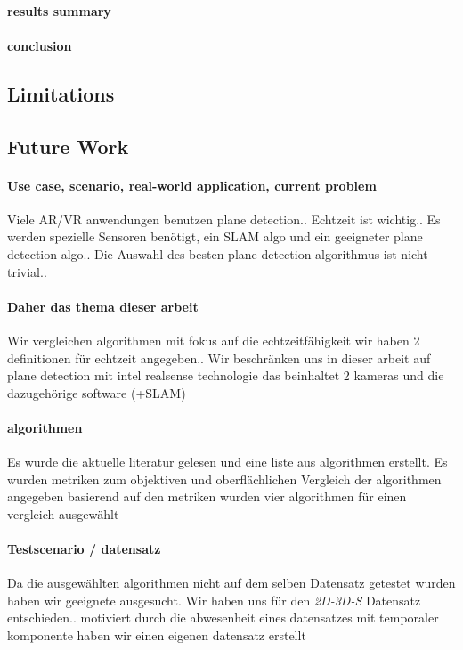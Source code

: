 \documentclass[main.tex]{subfiles}
\begin{document}
\paragraph{results summary}
\paragraph{conclusion}
\subsection{Limitations}
\subsection{Future Work}


\paragraph{Use case, scenario, real-world application, current problem}
Viele AR/VR anwendungen benutzen plane detection..
Echtzeit ist wichtig..
Es werden spezielle Sensoren benötigt, ein SLAM algo und ein geeigneter plane detection algo..
Die Auswahl des besten plane detection algorithmus ist nicht trivial..

\paragraph{Daher das thema dieser arbeit}
Wir vergleichen algorithmen mit fokus auf die echtzeitfähigkeit
wir haben 2 definitionen für echtzeit angegeben..
Wir beschränken uns in dieser arbeit auf plane detection mit intel realsense technologie
 das beinhaltet 2 kameras und die dazugehörige software (+SLAM)

\paragraph{algorithmen}
Es wurde die aktuelle literatur gelesen und eine liste aus algorithmen erstellt.
Es wurden metriken zum objektiven und oberflächlichen Vergleich der algorithmen angegeben
basierend auf den metriken wurden vier algorithmen für einen vergleich ausgewählt

\paragraph{Testscenario / datensatz}
Da die ausgewählten algorithmen nicht auf dem selben Datensatz getestet wurden haben wir 
geeignete ausgesucht.
Wir haben uns für den \textit{2D-3D-S} Datensatz entschieden..
motiviert durch die abwesenheit eines datensatzes mit temporaler komponente
 haben wir einen eigenen datensatz erstellt
\end{document}
